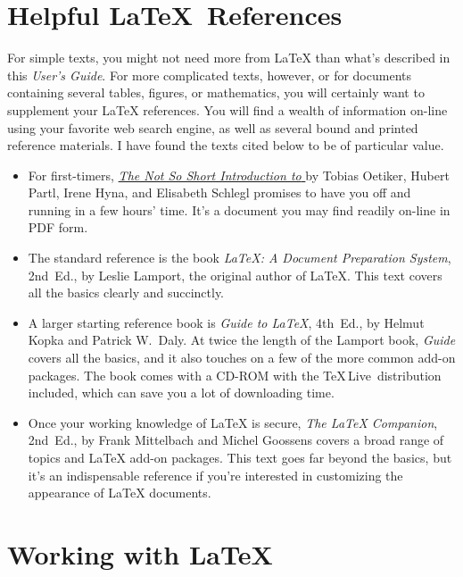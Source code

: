 \documentclass[11pt,letterpaper]{ltxdockit}[2011/03/25]
\newcommand*{\acro}[1]{{\small\textsc{#1}}}
\newcommand*{\booktitle}[1]{\textit{#1}}
\renewcommand{\-}{\discretionary{}{}{}}
\def\TeXLive{\TeX\,Live}
\begin{document}
\section{Helpful \LaTeX\ References}
\label{sec:references}

For simple texts, you might not need more from
\LaTeX{}
than what's described in this
\booktitle{User's Guide}.  For more complicated texts, however, or for
documents containing several tables, figures, or mathematics, you will
certainly want to supplement your \LaTeX{} references.  You will find
a wealth of information on-line using your favorite web search engine,
as well as several bound and printed reference materials.  I have
found the texts cited below to be of particular value.
\begin{itemize}
\item
For first-timers,
\href{http://www.ctan.org/tex-archive/info/lshort/english/lshort-letter.pdf}%
{\booktitle{The Not So Short Introduction to \LaTeXe}}
by Tobias Oetiker, Hubert Partl, Irene Hyna, and Elisabeth Schlegl
promises to have you off and running in a few hours' time.  It's a
document you may find readily on-line in \acro{PDF} form.

\item
The standard reference is the book \booktitle{\LaTeX: A Document
Preparation System}, 2nd~Ed., by Leslie Lamport, the original author
of \LaTeX{}.  This text covers all the basics clearly and succinctly.

\item
A larger starting reference book is \booktitle{Guide to \LaTeX},
4th~Ed., by Helmut Kopka and Patrick W.~Daly.  At twice the length of
the Lamport book, \booktitle{Guide} covers all the basics, and it also
touches on a few of the more common add-on packages.  The book
comes with a CD-ROM with the \TeXLive\ distribution included, which
can save you a lot of downloading time.

\item
Once your working knowledge of \LaTeX{} is secure, \booktitle{The
  \LaTeX{} Companion}, 2nd~Ed., by Frank Mittelbach and Michel
Goossens covers a broad range of topics and \LaTeX{} add-on packages.
This text goes far beyond the basics, but it's an indispensable
reference if you're interested in customizing the appearance of
\LaTeX{} documents.
\end{itemize}

\section{Working with \LaTeX}
\end{document}
